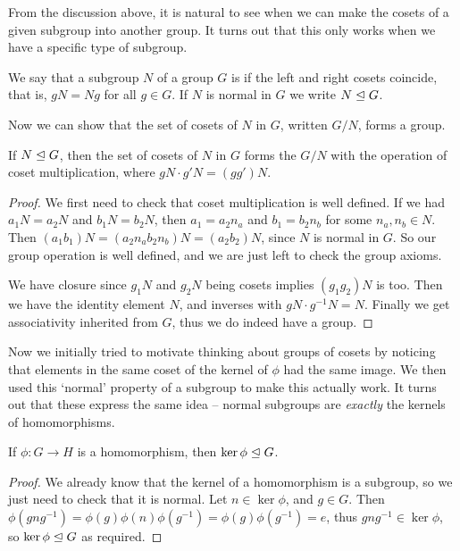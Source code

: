 \documentclass[11pt]{amsart}
\begin{document}
From the discussion above, it is natural to see when we can make the cosets of a given subgroup into another group. It turns out that this only works when we have a specific type of subgroup.

\begin{definition*}
	We say that a subgroup $N$ of a group $G$ is  if the left and right cosets coincide, that is, $gN = Ng$ for all $g \in G$. If $N$ is normal in $G$ we write $N \trianglelefteq G$.
\end{definition*}

Now we can show that the set of cosets of $N$ in $G$, written $G/N$, forms a group.

\begin{theorem*}
	If $N \trianglelefteq G$, then the set of cosets of $N$ in $G$ forms the  $G/N$ with the operation of coset multiplication, where $gN \cdot g'N = (g g')N$.
\end{theorem*}
\begin{proof}
	We first need to check that coset multiplication is well defined. If we had $a_1 N = a_2N$ and $b_1 N = b_2 N$, then $a_1 = a_2 n_a$ and $b_1 = b_2 n_b$ for some $n_a, n_b \in N$. Then $(a_1 b_1)N = (a_2 n_a b_2 n_b)N = (a_2 b_2)N$, since $N$ is normal in $G$. So our group operation is well defined, and we are just left to check the group axioms.

	We have closure since $g_1 N$ and $g_2N$ being cosets implies $(g_1 g_2)N$ is too. Then we have the identity element $N$, and inverses with $gN \cdot g^{-1}N = N$. Finally we get associativity inherited from $G$, thus we do indeed have a group.
\end{proof}

Now we initially tried to motivate thinking about groups of cosets by noticing that elements in the same coset of the kernel of $\phi$ had the same image. We then used this `normal' property of a subgroup to make this actually work. It turns out that these express the same idea -- normal subgroups are \emph{exactly} the kernels of homomorphisms.

\begin{theorem*}
	If $\phi: G \rightarrow H$ is a homomorphism, then $\ker \phi \trianglelefteq G$.
\end{theorem*}
\begin{proof}
	We already know that the kernel of a homomorphism is a subgroup, so we just need to check that it is normal. Let $n \in \ker \phi$, and $g \in G$. Then $\phi(gng^{-1}) = \phi(g) \phi(n)\phi(g^{-1}) = \phi(g) \phi(g^{-1}) = e$, thus $gng^{-1} \in \ker \phi$, so $\ker \phi \trianglelefteq G$ as required.
\end{proof}
\end{document}

